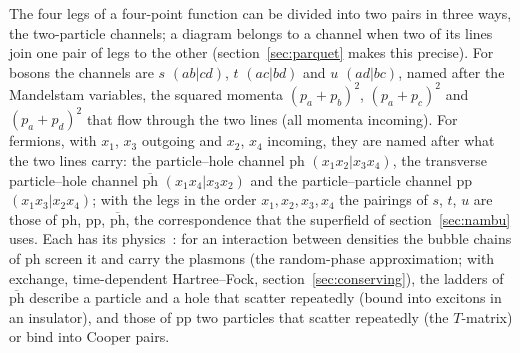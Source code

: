 \documentclass[11pt,a4paper]{article}
\newcommand{\phbar}{\overline{\mathrm{ph}}}
\newcommand{\ph}{\mathrm{ph}}
\newcommand{\pp}{\mathrm{pp}}
\begin{document}
The four legs of a four-point function can be divided into two pairs in three ways, the two-particle channels; a
diagram belongs to a channel when two of its lines join one pair of legs to the other (section~\ref{sec:parquet} makes
this precise). For bosons the channels are $s$ $(ab|cd)$, $t$ $(ac|bd)$ and $u$ $(ad|bc)$, named after the Mandelstam
variables, the squared momenta $(p_a+p_b)^2$, $(p_a+p_c)^2$ and $(p_a+p_d)^2$ that flow through the two lines (all
momenta incoming). For fermions, with $x_1$, $x_3$ outgoing and $x_2$, $x_4$ incoming, they are named after what the two
lines carry: the particle--hole channel $\ph$ $(x_1x_2|x_3x_4)$, the transverse particle--hole channel $\phbar$
$(x_1x_4|x_3x_2)$ and the particle--particle channel $\pp$ $(x_1x_3|x_2x_4)$; with the legs in the order
$x_1,x_2,x_3,x_4$ the pairings of $s$, $t$, $u$ are those of $\ph$, $\pp$, $\phbar$, the correspondence that the superfield
of section~\ref{sec:nambu} uses. Each has its physics~\cite{Bickers2004}: for
an interaction between densities the bubble chains of $\ph$ screen it and carry the plasmons (the random-phase
approximation; with exchange, time-dependent Hartree--Fock, section~\ref{sec:conserving}), the ladders of $\phbar$ describe a particle and a hole that scatter repeatedly (bound into excitons in an
insulator), and those of $\pp$ two particles that scatter repeatedly (the $T$-matrix) or bind into Cooper pairs.
\end{document}
